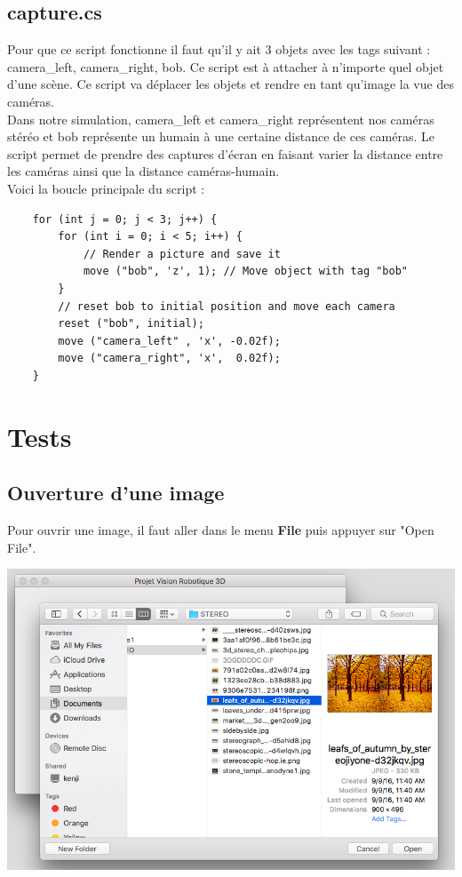 \documentclass[a4paper]{article}
\begin{document}
\subsection*{capture.cs}

Pour que ce script fonctionne il faut qu'il y ait 3 objets avec les tags suivant :
camera\_left, camera\_right, bob. Ce script est à attacher à n'importe quel objet
d'une scène. Ce script va déplacer les objets et rendre en tant qu'image la vue des
caméras. \\
Dans notre simulation, camera\_left et camera\_right représentent nos caméras stéréo
et bob représente un humain à une certaine distance de ces caméras. Le script
permet de prendre des captures d'écran en faisant varier la distance entre les caméras
ainsi que la distance caméras-humain. \\
Voici la boucle principale du script :
\begin{verbatim}
	for (int j = 0; j < 3; j++) {
		for (int i = 0; i < 5; i++) {
			// Render a picture and save it
			move ("bob", 'z', 1); // Move object with tag "bob"
		}
		// reset bob to initial position and move each camera
		reset ("bob", initial);
		move ("camera_left" , 'x', -0.02f);
		move ("camera_right", 'x',  0.02f);
	}
\end{verbatim}



\newpage
\section{Tests}

\subsection*{Ouverture d'une image}

Pour ouvrir une image, il faut aller dans le menu \textbf{File} puis appuyer sur
"Open File". \\[0.4cm]
\centerline{\includegraphics[width=\textwidth,height=\textheight,keepaspectratio]{img/1.png}}
\end{document}
